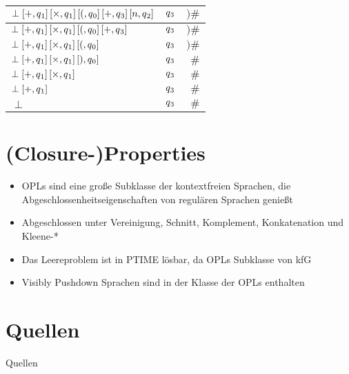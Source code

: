 \documentclass[
10pt,
pantone315, 	%
]{beamer}
\begin{document}
\begin{frame}
\begin{tabular}{| l | c | r |}
	$\perp\left[+, q\textsubscript{1} \right]\left[\times, q\textsubscript{1} \right] \left[(, q\textsubscript{0} \right] \left[+, q\textsubscript{3} \right] \left[n, q\textsubscript{2} \right]$ 
	& $q \textsubscript{3}$ & $)\#$ \\ \hline
	
	$\perp\left[+, q\textsubscript{1} \right]\left[\times, q\textsubscript{1} \right] \left[(, q\textsubscript{0} \right] \left[+, q\textsubscript{3} \right]$ 
	& $q \textsubscript{3}$ & $)\#$ \\ \hline
	
	$\perp\left[+, q\textsubscript{1} \right]\left[\times, q\textsubscript{1} \right] \left[(, q\textsubscript{0} \right]$ 
	& $q \textsubscript{3}$ & $)\#$ \\ \hline
	
	$\perp\left[+, q\textsubscript{1} \right]\left[\times, q\textsubscript{1} \right] \left[), q\textsubscript{0} \right]$ 
	& $q \textsubscript{3}$ & $\#$ \\ \hline
	
	$\perp\left[+, q\textsubscript{1} \right]\left[\times, q\textsubscript{1} \right]$ 
	& $q \textsubscript{3}$ & $\#$ \\ \hline
	
	$\perp\left[+, q\textsubscript{1} \right]$ 
	& $q \textsubscript{3}$ & $\#$ \\ \hline
	
	$\perp$ 
	& $q \textsubscript{3}$ & $\#$ \\ \hline
	\end{tabular}
	
\end{frame}

\section{(Closure-)Properties}
\begin{frame}[t]{\secname}
	\begin{itemize}[<+->]
	\item 
	OPLs sind eine große Subklasse der kontextfreien Sprachen, die Abgeschlossenheitseigenschaften von regulären Sprachen genießt
	\item
	Abgeschlossen unter Vereinigung, Schnitt, Komplement, Konkatenation und Kleene-*
	\item
	Das Leereproblem ist in PTIME lösbar, da OPLs Subklasse von kfG
	\item Visibly Pushdown Sprachen sind in der Klasse der OPLs enthalten
	\end{itemize}
\end{frame}

\nocite{*}
\section*{Quellen}
\begin{frame}{Quellen}
	\printbibliography
\end{frame}
\end{document}
